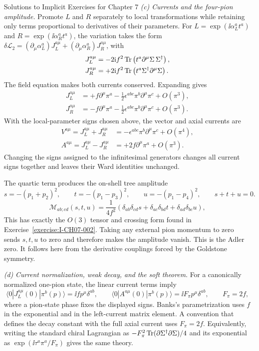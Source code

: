 \begin{bankssolutions}{Solutions to Implicit Exercises for Chapter 7}
\textit{(c) Currents and the four-pion amplitude.}
Promote $L$ and $R$ separately to local transformations while retaining only
terms proportional to derivatives of their parameters.  For
$L=\exp(\ii\alpha_L^at^a)$ and
$R=\exp(\ii\alpha_R^at^a)$, the variation takes the form
$\delta\mathcal L_2=(\partial_\mu\alpha_L^a)J_L^{a\mu}
+(\partial_\mu\alpha_R^a)J_R^{a\mu}$, with
\begin{align*}
 J_L^{a\mu}&=-2\mathrm{i} f^2\operatorname{Tr}\left(t^a
 \partial^\mu\Sigma\,\Sigma^\dagger\right),\\
 J_R^{a\mu}&=+2\mathrm{i} f^2\operatorname{Tr}\left(t^a
 \Sigma^\dagger\partial^\mu\Sigma\right).
\end{align*}
The field equation makes both currents conserved.  Expanding gives
\begin{align*}
 J_L^{a\mu}
 &=+f\partial^\mu\pi^a
 -\frac12\epsilon^{abc}\pi^b\partial^\mu\pi^c+O(\pi^3),\\
 J_R^{a\mu}
 &=-f\partial^\mu\pi^a
 -\frac12\epsilon^{abc}\pi^b\partial^\mu\pi^c+O(\pi^3).
\end{align*}
With the local-parameter signs chosen above, the vector and axial
currents are
\begin{align*}
 V^{a\mu}=J_L^{a\mu}+J_R^{a\mu}
 &=-\epsilon^{abc}\pi^b\partial^\mu\pi^c+O(\pi^4),\\
 A^{a\mu}=J_L^{a\mu}-J_R^{a\mu}
 &=+2f\partial^\mu\pi^a+O(\pi^3).
\end{align*}
Changing the signs assigned to the infinitesimal generators changes all
current signs together and leaves their Ward identities unchanged.

The quartic term produces the on-shell tree amplitude
\[
 s=-(p_1+p_2)^2,\qquad t=-(p_1-p_3)^2,\qquad
 u=-(p_1-p_4)^2,\qquad s+t+u=0.
\]
\begin{equation*}
 \boxed{\mathcal M_{ab;cd}(s,t,u)
 =\frac{1}{4f^2}\left(
 \delta_{ab}\delta_{cd}s
 +\delta_{ac}\delta_{bd}t
 +\delta_{ad}\delta_{bc}u\right),}
\end{equation*}
This has exactly the $O(3)$ tensor and crossing form found in
Exercise~\ref{exercise:I-CH07-002}.  Taking any external pion momentum to
zero sends $s,t,u$ to zero and therefore makes the amplitude vanish.  This is
the Adler zero.  It follows here from the derivative couplings forced by the
Goldstone symmetry.

\textit{(d) Current normalization, weak decay, and the soft theorem.}
For a canonically normalized one-pion state, the linear current terms imply
\[
 \langle0|J_L^{a\mu}(0)|\pi^b(p)\rangle
 =\ii f p^\mu\delta^{ab},
 \qquad
 \langle0|A^{a\mu}(0)|\pi^b(p)\rangle
 =\ii F_\pi p^\mu\delta^{ab},
 \qquad F_\pi=2f,
\]
where a pion-state phase fixes the displayed signs.  Banks's parametrization
uses $f$ in the exponential and in the left-current matrix element.  A
convention that defines the decay constant with the full axial current uses
$F_\pi=2f$.  Equivalently, writing the standard chiral Lagrangian as
$-F_\pi^2\operatorname{Tr}(\partial\Sigma^\dagger\partial\Sigma)/4$ and its exponential as
$\exp(\ii\tau^a\pi^a/F_\pi)$ gives the same theory.


\end{bankssolutions}
